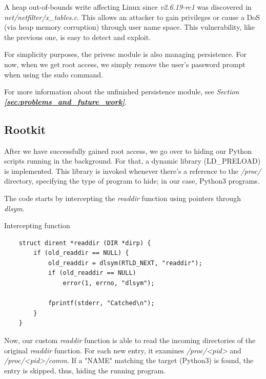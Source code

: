 A heap out-of-bounds write affecting Linux since \textit{v2.6.19-rc1} was discovered in \textit{net/netfilter/x\_tables.c}. This allows an attacker to gain privileges or cause a DoS (via heap memory corruption) through user name space. This vulnerability, like the previous one, is easy to detect and exploit.

For simplicity purposes, the privesc module is also managing persistence. For now, when we get root access, we simply remove the user's password prompt when using the sudo command.

For more information about the unfinished persistence module, see \textit{Section \textbf{\ref{sec:problems_and_future_work}}}.


\subsection{Rootkit}

After we have successfully gained root access, we go over to hiding our Python scripts running in the background. For that, a dynamic library (LD\_PRELOAD) is implemented. This library is invoked whenever there's a reference to the \textit{/proc/} directory, specifying the type of program to hide; in our case, Python3 programs.

The code starts by intercepting the \textit{readdir} function using pointers through \textit{dlsym}.

\begin{codesnippet}[H]
    \caption{Intercepting function}
    \label{code:intercepting_function}
\end{codesnippet}
\vspace{-0.75cm}
\begin{lstlisting}
    struct dirent *readdir (DIR *dirp) {
        if (old_readdir == NULL) {
            old_readdir = dlsym(RTLD_NEXT, "readdir");
            if (old_readdir == NULL) 
                error(1, errno, "dlsym");

            fprintf(stderr, "Catched\n");		
        }
    }
\end{lstlisting}

Now, our custom \textit{readdir} function is able to read the incoming directories of the original \textit{readdir} function. For each new entry, it examines \textit{/proc/\textless pid\textgreater} and \textit{/proc/\textless pid\textgreater/comm}. If a "NAME" matching the target (Python3) is found, the entry is skipped, thus, hiding the running program.

